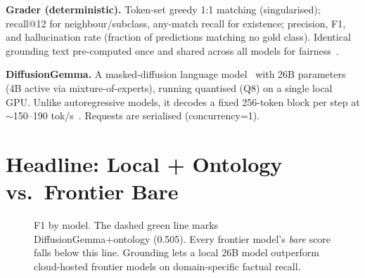 \documentclass[11pt]{article}
\begin{document}
\begin{samepage}
\textbf{Grader (deterministic).} Token-set greedy 1:1 matching (singularised); recall@12 for
neighbour/subclass, any-match recall for existence; precision, F1, and hallucination rate
(fraction of predictions matching no gold class). Identical grounding text pre-computed once and
shared across all models for fairness~\cite{jacovi2025facts}.
\end{samepage}

\textbf{DiffusionGemma.} A masked-diffusion language model~\cite{nie2025llada} with 26B
parameters (4B active via mixture-of-experts), running quantised (Q8) on a single local GPU.
Unlike autoregressive models, it decodes a fixed 256-token block per step at $\sim$150--190
tok/s~\cite{labs2025mercury}. Requests are serialised (concurrency=1).

\section{Headline: Local + Ontology vs.\ Frontier Bare}

\begin{figure}[h]\centering
{}
\caption{F1 by model. The dashed green line marks DiffusionGemma+ontology (0.505). Every frontier
model's \emph{bare} score falls below this line. Grounding lets a local 26B model outperform
cloud-hosted frontier models on domain-specific factual recall.}
\end{figure}
\end{document}
